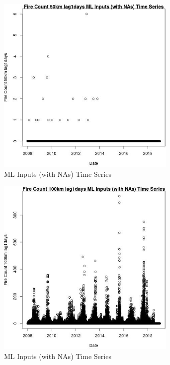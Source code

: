 \begin{figure} 
\centering  
\includegraphics[width=0.77\textwidth]{Code_Outputs/Report_ML_input_PM25_Step4_part_e_de_duplicated_aves_compiled_2019-05-21wNAs_Fire_Count_50km_lag1daysvDate.jpg} 
\caption{\label{fig:Report_ML_input_PM25_Step4_part_e_de_duplicated_aves_compiled_2019-05-21wNAsFire_Count_50km_lag1daysvDate}ML Inputs (with NAs) Time Series} 
\end{figure} 
 

\begin{figure} 
\centering  
\includegraphics[width=0.77\textwidth]{Code_Outputs/Report_ML_input_PM25_Step4_part_e_de_duplicated_aves_compiled_2019-05-21wNAs_Fire_Count_100km_lag1daysvDate.jpg} 
\caption{\label{fig:Report_ML_input_PM25_Step4_part_e_de_duplicated_aves_compiled_2019-05-21wNAsFire_Count_100km_lag1daysvDate}ML Inputs (with NAs) Time Series} 
\end{figure} 
 

